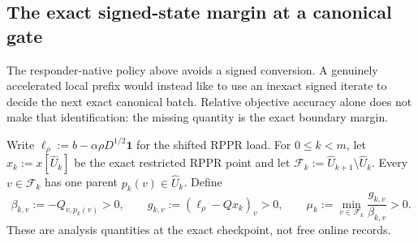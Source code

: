 \subsection{The exact signed-state margin at a canonical gate}
\label{sec:branch-caterpillar-signed-gate-margin}

The responder-native policy above avoids a signed conversion.  A genuinely
accelerated local prefix would instead like to use an inexact signed iterate
to decide the next exact canonical batch.  Relative objective accuracy alone
does not make that identification: the missing quantity is the exact
boundary margin.

Write
$\ell_\rho:=b-\alpha\rho D^{1/2}\mathbf 1$ for the shifted RPPR load.
For $0\leq k<m$, let $x_k:=x[\widehat U_k]$ be the exact restricted RPPR
point and let
$\mathcal F_k:=\widehat U_{k+1}\setminus\widehat U_k$.  Every
$v\in\mathcal F_k$ has one parent $p_k(v)\in\widehat U_k$.  Define
\begin{equation}
 \beta_{k,v}:=-Q_{v,p_k(v)}>0,
 \qquad
 g_{k,v}:=(\ell_\rho-Qx_k)_v>0,
 \qquad
 \mu_k:=\min_{v\in\mathcal F_k}\frac{g_{k,v}}{\beta_{k,v}}>0.
 \label{eq:branch-caterpillar-signed-gate-margin}
\end{equation}
These are analysis quantities at the exact checkpoint, not free online
records.

